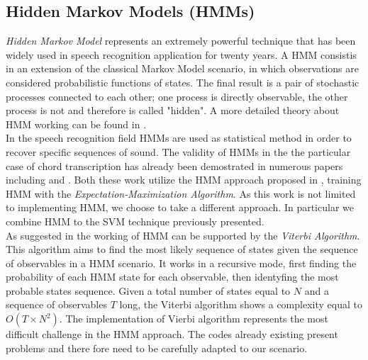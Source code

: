 \subsection{Hidden Markov Models (HMMs)}
\label{subsec:hmm}

\textit{Hidden Markov Model} represents an extremely powerful technique that has been widely used in speech recognition application for twenty years. A HMM consistis in an extension of the classical Markov Model scenario, in which observations are considered probabilistic functions of states. The final result is a pair of stochastic processes connected to each other; one process is directly observable, the other process is not and therefore is called "hidden". A more detailed theory about HMM working can be found in \cite{LawrenceHMMtutorial}. \\
%
In the speech recognition field HMMs are used as statistical method in order to recover specific sequences of sound. The validity of HMMs in the the particular case of chord transcription has already been demostrated in numerous papers including \cite{AlexDanEMplusHMM} and \cite{belpickMusic}. Both these work utilize the HMM approach proposed in \cite{GoldMorganSpeechRecogn}, training HMM with the \textit{Expectation-Maximization Algorithm}. As this work is not limited to implementing HMM, we choose to take a different approach. In particular we combine HMM to the SVM technique previously presented. \\
%
As suggested in \cite{GoldMorganSpeechRecogn} the working of HMM can be supported by the \textit{Viterbi Algorithm}. This algorithm aims to find the most likely sequence of states given the sequence of observables in a HMM scenario. It works in a recursive mode, first finding the probability of each HMM state for each observable, then identyfing the most probable states sequence. Given a total number of states equal to $N$ and a sequence of observables $T$ long, the Viterbi algorithm shows a complexity equal to $O(T \times N^2)$. The implementation of Vierbi algorithm represents the most difficult challenge in the HMM approach. The codes already existing present problems and there fore need to be carefully adapted to our scenario.

